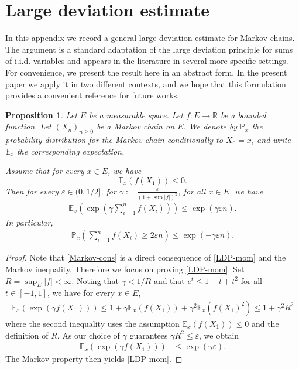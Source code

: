 \documentclass[11pt, leqno, fleqn]{amsart}
\def\eps{\varepsilon}
\def \R{{\mathbb R}}
\newcommand{\EV}{{\mathbb E}}
\newcommand{\ary}{\begin{eqnarray}}
\newcommand{\eary}{\end{eqnarray}}
\newtheorem{prop}[thm]{\bf Proposition}
\theoremstyle{definition}
\theoremstyle{definition}
\begin{document}
\appendix
	\section{Large deviation estimate}	 \label{app-LDP}
In this appendix we record a general large deviation estimate for Markov chains. The argument is a standard adaptation of the large deviation principle for sums of i.i.d. variables and appears in the literature in several more specific settings. For convenience, we present the result here in an abstract form. In the present paper we apply it in two different contexts, and we hope that this formulation provides a convenient reference for future works.
	
\begin{prop}\label{LDP-MC}
	Let $E$ be a measurable space. Let $f:E\rightarrow \R$ be a bounded function.  Let $(X_{n})_{n\geq 0}$ be a Markov chain on $E$. We denote by  $\mathbb{P}_{x}$ the probability distribution for the Markov chain conditionally to $X_{0}=x$, and  write $\EV_{x}$ the corresponding expectation.
	
	 Assume that   for every $x\in E$, we have 
	$$\EV_{x}\left(f(X_{1}) \right) \leq 0.$$
	Then for every $\eps \in(0,1/2]$,  for $\gamma := \frac{\eps}{(1+\sup |f|)^2}$,  for all $x\in E$, we have
	\ary \label{LDP-mom} 
	\EV_{x}\left(\exp(\gamma  \sum_{i=1}^{n} f(X_{i})) \right)\leq \exp(\gamma \eps n).
	\eary
	In particular, 
	\ary\label{Markov-cons}
	\mathbb{P}_{x}\left( \sum_{i=1}^{n} f(X_{i}) \geq 2\eps n \right) \leq  \exp(-\gamma \eps n).
	\eary
\end{prop}

	\begin{proof}
	Note that \eqref{Markov-cons} is a direct consequence of \eqref{LDP-mom} and the Markov inequality. Therefore we focus on proving \eqref{LDP-mom}. 
	Set $R=\sup_{E} |f|<\infty$. Noting that $\gamma<1/R$ and  that $e^t\leq 1+t+t^2$ for all $t\in [-1,1]$, we have for every $x\in E$, 
	\begin{align*}
	\EV_{x}\left(\exp(\gamma  f(X_{1})) \right)
	\leq 1+ \gamma \EV_{x}(  f(X_{1}) )+ \gamma^2 \EV_{x}(  f(X_{1})^2)
	\leq  1+ \gamma^2 R^2
	\end{align*}
	where the second inequality uses the assumption $\EV_{x}(  f(X_{1}) )\leq 0$ and the definition of $R$.
	As our choice of $\gamma$ guarantees $\gamma R^2\leq \eps$, we obtain 
		\begin{align*}
	\EV_{x}\left(\exp(\gamma  f(X_{1})) \right)
	&\leq \exp(\gamma \eps).
		\end{align*}
	The Markov property then yields \eqref{LDP-mom}.
	\end{proof}
	
\end{document}
